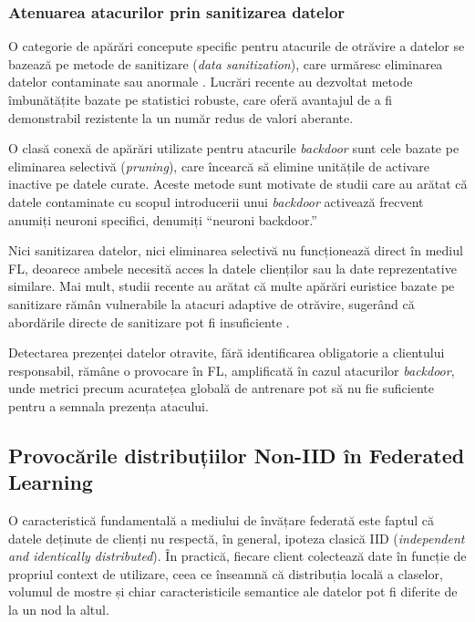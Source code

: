\documentclass[../../main.tex]{subfiles}
\begin{document}
    \subsubsection{Atenuarea atacurilor prin sanitizarea datelor}

    O categorie de apărări concepute specific pentru atacurile de otrăvire a datelor se bazează pe metode de sanitizare (\textit{data sanitization}), care urmăresc eliminarea datelor contaminate sau anormale \cite{kairouz2021federated}. Lucrări recente au dezvoltat metode îmbunătățite bazate pe statistici robuste, care oferă avantajul de a fi demonstrabil rezistente la un număr redus de valori aberante.

    O clasă conexă de apărări utilizate pentru atacurile \textit{backdoor} sunt cele bazate pe eliminarea selectivă (\textit{pruning}), care încearcă să elimine unitățile de activare inactive pe datele curate. Aceste metode sunt motivate de studii care au arătat că datele contaminate cu scopul introducerii unui \textit{backdoor} activează frecvent anumiți neuroni specifici, denumiți ``neuroni backdoor.''

    Nici sanitizarea datelor, nici eliminarea selectivă nu funcționează direct în mediul FL, deoarece ambele necesită acces la datele clienților sau la date reprezentative similare. Mai mult, studii recente au arătat că multe apărări euristice bazate pe sanitizare rămân vulnerabile la atacuri adaptive de otrăvire, sugerând că abordările directe de sanitizare pot fi insuficiente \cite{kairouz2021federated}.

Detectarea prezenței datelor otravite, fără identificarea obligatorie a clientului responsabil, rămâne o provocare în FL, amplificată în cazul atacurilor \textit{backdoor}, unde metrici precum acuratețea globală de antrenare pot să nu fie suficiente pentru a semnala prezența atacului.

    \newpage
    \subsection{Provocările distribuțiilor Non-IID în Federated Learning}

    O caracteristică fundamentală a mediului de învățare federată este faptul că datele deținute de clienți nu respectă, în general, ipoteza clasică IID (\textit{independent and identically distributed}). În practică, fiecare client colectează date în funcție de propriul context de utilizare, ceea ce înseamnă că distribuția locală a claselor, volumul de mostre și chiar caracteristicile semantice ale datelor pot fi diferite de la un nod la altul.
\end{document}
